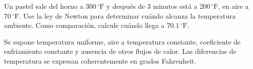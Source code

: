 Un pastel sale del horno a $300\,{}^\circ\mathrm F$ y después de $3$ minutos está a $200\,{}^\circ\mathrm F$, en aire a $70\,{}^\circ\mathrm F$. Use la ley de Newton para determinar cuándo alcanza la temperatura ambiente. Como comparación, calcule cuándo llega a $70.1\,{}^\circ\mathrm F$.

Se supone temperatura uniforme, aire a temperatura constante, coeficiente de enfriamiento constante y ausencia de otros flujos de calor. Las diferencias de temperatura se expresan coherentemente en grados Fahrenheit.
